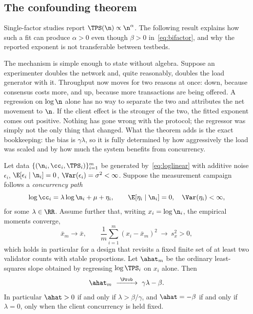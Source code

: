 \subsection{The confounding theorem}

Single-factor studies report $\TPS(\n)\propto\n^{\alpha}$. The following result
explains how such a fit can produce $\alpha>0$ even though $\beta>0$
in~\eqref{eq:bifactor}, and why the reported exponent is not transferable
between testbeds.

The mechanism is simple enough to state without algebra. Suppose an
experimenter doubles the network and, quite reasonably, doubles the load
generator with it. Throughput now moves for two reasons at once: down, because
consensus costs more, and up, because more transactions are being offered. A
regression on $\log\n$ alone has no way to separate the two and attributes the
net movement to $\n$. If the client effect is the stronger of the two, the
fitted exponent comes out positive. Nothing has gone wrong with the protocol;
the regressor was simply not the only thing that changed. What the theorem adds
is the exact bookkeeping: the bias is $\gamma\lambda$, so it is fully determined
by how aggressively the load was scaled and by how much the system benefits from
concurrency.

\begin{Theorem}
\label{thm:identifiability}
Let data $\{(\n_{i},\cc_{i},\TPS_{i})\}_{i=1}^{m}$ be generated
by~\eqref{eq:loglinear} with additive noise $\epsilon_{i}$,
$\E[\epsilon_{i}\mid\n_{i}]=0$, $\Var(\epsilon_{i})=\sigma^{2}<\infty$. Suppose
the measurement campaign follows a \emph{concurrency path}
\begin{equation}
\log\cc_{i}=\lambda\log\n_{i}+\mu+\eta_{i},
\qquad
\E[\eta_{i}\mid\n_{i}]=0,\quad \Var(\eta_{i})<\infty,
\label{eq:path}
\end{equation}
for some $\lambda\in\RR$. Assume further that, writing $x_{i}=\log\n_{i}$, the
empirical moments converge,
\begin{equation}
\bar{x}_{m}\to\bar{x},\qquad
\frac{1}{m}\sum_{i=1}^{m}(x_{i}-\bar{x}_{m})^{2}\ \to\ s_{x}^{2}>0 ,
\label{eq:regularity}
\end{equation}
which holds in particular for a design that revisits a fixed finite set of at
least two validator counts with stable proportions. Let $\ahat_{m}$ be the
ordinary least-squares slope obtained by regressing $\log\TPS_{i}$ on $x_{i}$
alone. Then
\begin{equation}
\ahat_{m}\ \xrightarrow{\ \Prob\ }\ \gamma\lambda-\beta .
\label{eq:confounding}
\end{equation}
In particular $\ahat>0$ if and only if $\lambda>\beta/\gamma$, and $\ahat=-\beta$
if and only if $\lambda=0$, \ie{} only when the client concurrency is held fixed.
\end{Theorem}

